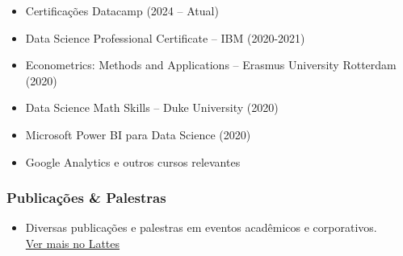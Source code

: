 \documentclass[
  letterpaper,
  DIV=11,
  numbers=noendperiod]{scrartcl}
\providecommand{\tightlist}{%
  \setlength{\itemsep}{0pt}\setlength{\parskip}{0pt}}\usepackage{longtable,booktabs,array}
\begin{document}
\begin{itemize}
\tightlist
\item
  Certificações Datacamp (2024 -- Atual)
\item
  Data Science Professional Certificate -- IBM (2020-2021)
\item
  Econometrics: Methods and Applications -- Erasmus University Rotterdam
  (2020)
\item
  Data Science Math Skills -- Duke University (2020)
\item
  Microsoft Power BI para Data Science (2020)
\item
  Google Analytics e outros cursos relevantes
\end{itemize}

\subsubsection{Publicações \&
Palestras}\label{publicauxe7uxf5es-palestras}

\begin{itemize}
\item
  Diversas publicações e palestras em eventos acadêmicos e
  corporativos.\\
  \href{http://lattes.cnpq.br/3532649625879285}{Ver mais no Lattes}
\end{itemize}
\end{document}
